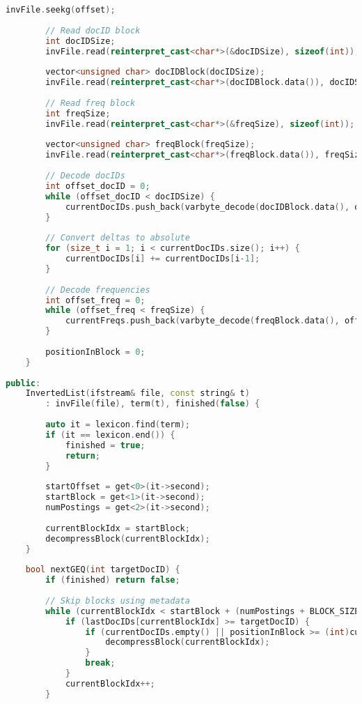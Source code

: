 \documentclass[11pt, a4paper]{report}
\begin{document}
\begin{lstlisting}[language=C++, caption={The complete source code for the query processor.}, label={lst:query}]
        invFile.seekg(offset);
        
        // Read docID block
        int docIDSize;
        invFile.read(reinterpret_cast<char*>(&docIDSize), sizeof(int));
        
        vector<unsigned char> docIDBlock(docIDSize);
        invFile.read(reinterpret_cast<char*>(docIDBlock.data()), docIDSize);
        
        // Read freq block
        int freqSize;
        invFile.read(reinterpret_cast<char*>(&freqSize), sizeof(int));
        
        vector<unsigned char> freqBlock(freqSize);
        invFile.read(reinterpret_cast<char*>(freqBlock.data()), freqSize);
        
        // Decode docIDs
        int offset_docID = 0;
        while (offset_docID < docIDSize) {
            currentDocIDs.push_back(varbyte_decode(docIDBlock.data(), offset_docID));
        }
        
        // Convert deltas to absolute
        for (size_t i = 1; i < currentDocIDs.size(); i++) {
            currentDocIDs[i] += currentDocIDs[i-1];
        }
        
        // Decode frequencies
        int offset_freq = 0;
        while (offset_freq < freqSize) {
            currentFreqs.push_back(varbyte_decode(freqBlock.data(), offset_freq));
        }
        
        positionInBlock = 0;
    }
    
public:
    InvertedList(ifstream& file, const string& t) 
        : invFile(file), term(t), finished(false) {
        
        auto it = lexicon.find(term);
        if (it == lexicon.end()) {
            finished = true;
            return;
        }
        
        startOffset = get<0>(it->second);
        startBlock = get<1>(it->second);
        numPostings = get<2>(it->second);
        
        currentBlockIdx = startBlock;
        decompressBlock(currentBlockIdx);
    }
    
    bool nextGEQ(int targetDocID) {
        if (finished) return false;
        
        // Skip blocks using metadata
        while (currentBlockIdx < startBlock + (numPostings + BLOCK_SIZE - 1) / BLOCK_SIZE) {
            if (lastDocIDs[currentBlockIdx] >= targetDocID) {
                if (currentDocIDs.empty() || positionInBlock >= (int)currentDocIDs.size()) {
                    decompressBlock(currentBlockIdx);
                }
                break;
            }
            currentBlockIdx++;
        }
        

\end{lstlisting}
\end{document}
